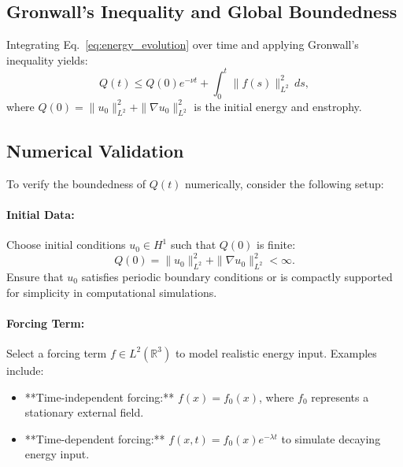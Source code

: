 \documentclass[12pt]{article}
\theoremstyle{definition}
\begin{document}
\subsection{Gronwall’s Inequality and Global Boundedness}
Integrating Eq.~\eqref{eq:energy_evolution} over time and applying Gronwall’s inequality yields:
\begin{equation}
Q(t) \leq Q(0) e^{-\nu t} + \int_0^t \|f(s)\|_{L^2}^2 \, ds,
\label{eq:qt_boundedness}
\end{equation}
where $Q(0) = \|u_0\|_{L^2}^2 + \|\nabla u_0\|_{L^2}^2$ is the initial energy and enstrophy.

\subsection{Numerical Validation}
To verify the boundedness of $Q(t)$ numerically, consider the following setup:

\paragraph{Initial Data:}
Choose initial conditions $u_0 \in H^1$ such that $Q(0)$ is finite:
\begin{equation}
Q(0) = \|u_0\|_{L^2}^2 + \|\nabla u_0\|_{L^2}^2 < \infty.
\end{equation}
Ensure that $u_0$ satisfies periodic boundary conditions or is compactly supported for simplicity in computational simulations.

\paragraph{Forcing Term:}
Select a forcing term $f \in L^2(\mathbb{R}^3)$ to model realistic energy input. Examples include:
\begin{itemize}
    \item **Time-independent forcing:** $f(x) = f_0(x)$, where $f_0$ represents a stationary external field.
    \item **Time-dependent forcing:** $f(x, t) = f_0(x) e^{-\lambda t}$ to simulate decaying energy input.
\end{itemize}
\end{document}
